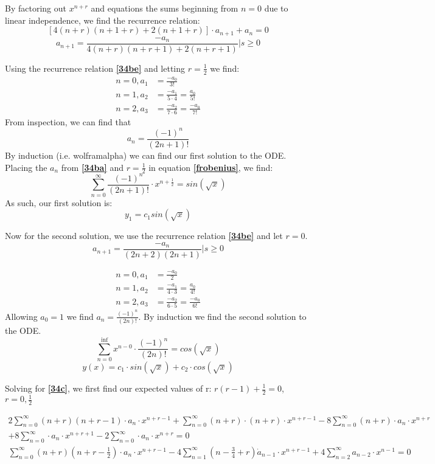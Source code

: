 \documentclass{article}
\begin{document}
By factoring out $x^{n+r}$ and equations the sums beginning from $n=0$ due to linear independence, we find the recurrence relation:
\[
\left[4(n+r)(n+1+r)+2(n+1+r)\right] \cdot a_{n+1} + a_n = 0
\]
\begin{equation}\label{34be}
a_{n+1} = \frac{-a_n}{4(n+r)(n+r+1)+2(n+r+1)} \Bigr| s\geq0
\end{equation}


Using the recurrence relation \textbf{\eqref{34be}} and letting $r=\frac{1}{2}$ we find:
\begin{align*}
n=0, a_1 &= \frac{-a_0}{3!}\\
n=1, a_2 &= \frac{-a_1}{5 \cdot 4} = \frac{a_0}{5!}\\
n=2, a_3 &= \frac{-a_2}{7 \cdot 6} = \frac{-a_0}{7!}
\end{align*}
From inspection, we can find that
\begin{equation}\label{34ba}
a_n = \frac{(-1)^n}{(2n+1)!}
\end{equation}
By induction (i.e. wolframalpha) we can find our first solution to the ODE. Placing the $a_n$ from \textbf{\eqref{34ba}} and $ r = \frac{1}{2} $ in equation \textbf{\eqref{frobenius}}, we find:
\[
\sum_{n=0}^{\infty}{\frac{(-1)^n}{(2n+1)!} \cdot x^{n+\frac{1}{2}}} = sin(\sqrt{x})
\]
As such, our first solution is:
\[y_1 = c_1sin(\sqrt{x})
\]

Now for the second solution, we use the recurrence relation \textbf{\eqref{34be}} and let $r=0$.
\[
a_{n+1} = \frac{-a_n}{(2n+2)(2n+1)} \Bigr| s\geq0
\]

\begin{align*}
n=0, a_1 &= \frac{-a_0}{2}\\
n=1, a_2 &= \frac{-a_1}{4 \cdot 3} = \frac{a_0}{4!}\\
n=2, a_3 & = \frac{-a_2}{6 \cdot 5} = \frac{-a_0}{6!}
\end{align*}
Allowing $a_0=1$ we find $a_n = \frac{(-1)^n}{(2n)!}$.
By induction we find the second solution to the ODE.
\[
\sum_{n=0}^{\inf} x^{n-0} \cdot \frac{(-1)^n}{(2n)!} = cos(\sqrt{x})
\]
\[
y(x) = c_1 \cdot sin(\sqrt{x}) + c_2 \cdot cos(\sqrt{x})
\]
\par

Solving for \textbf{\eqref{34c}}, we first find our expected values of r: $r(r-1)+\frac{1}{2} =0$, $r = 0,\frac{1}{2}$

\begin{align*}
2\sum_{n=0}^{\infty}(n+r)(n+r-1) \cdot a_n \cdot x^{n+r-1} + \sum_{n=0}^{\infty} (n+r) \cdot (n+r) \cdot x^{n+r-1} - 8\sum_{n=0}^{\infty} (n+r) \cdot a_n \cdot x^{n+r}\\
+ 8 \sum_{n=0}^{\infty} \cdot a_n \cdot x^{n+r+1} - 2 \sum_{n=0}^{\infty} \cdot a_n \cdot x^{n+r} =0\\
\sum_{n=0}^{\infty} (n+r)(n+r-\frac{1}{2}) \cdot a_n \cdot x^{n+r-1} - 4 \sum_{n=1}^{\infty} (n-\frac{3}{4}+r) \dot a_{n-1} \cdot x^{n+r-1} + 4\sum_{n=2}^{\infty} a_{n-2} \cdot x^{n-1} = 0
\end{align*}
\end{document}
